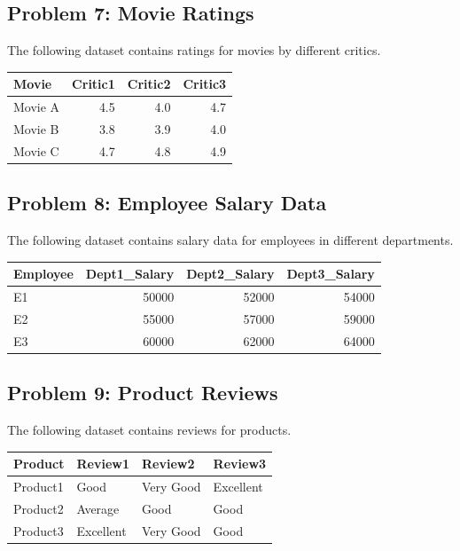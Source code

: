 \documentclass[
  letterpaper,
  DIV=11,
  numbers=noendperiod]{scrreprt}
\begin{document}
\subsection*{Problem 7: Movie Ratings}\label{problem-7-movie-ratings}

The following dataset contains ratings for movies by different critics.

\begin{table}
\centering
\begin{tabular}{l|r|r|r}
\hline
Movie & Critic1 & Critic2 & Critic3\\
\hline
Movie A & 4.5 & 4.0 & 4.7\\
\hline
Movie B & 3.8 & 3.9 & 4.0\\
\hline
Movie C & 4.7 & 4.8 & 4.9\\
\hline
\end{tabular}
\end{table}

\subsection*{Problem 8: Employee Salary
Data}\label{problem-8-employee-salary-data}

The following dataset contains salary data for employees in different
departments.

\begin{table}
\centering
\begin{tabular}{l|r|r|r}
\hline
Employee & Dept1\_Salary & Dept2\_Salary & Dept3\_Salary\\
\hline
E1 & 50000 & 52000 & 54000\\
\hline
E2 & 55000 & 57000 & 59000\\
\hline
E3 & 60000 & 62000 & 64000\\
\hline
\end{tabular}
\end{table}

\subsection*{Problem 9: Product
Reviews}\label{problem-9-product-reviews}

The following dataset contains reviews for products.

\begin{table}
\centering
\begin{tabular}{l|l|l|l}
\hline
Product & Review1 & Review2 & Review3\\
\hline
Product1 & Good & Very Good & Excellent\\
\hline
Product2 & Average & Good & Good\\
\hline
Product3 & Excellent & Very Good & Good\\
\hline
\end{tabular}
\end{table}
\end{document}

